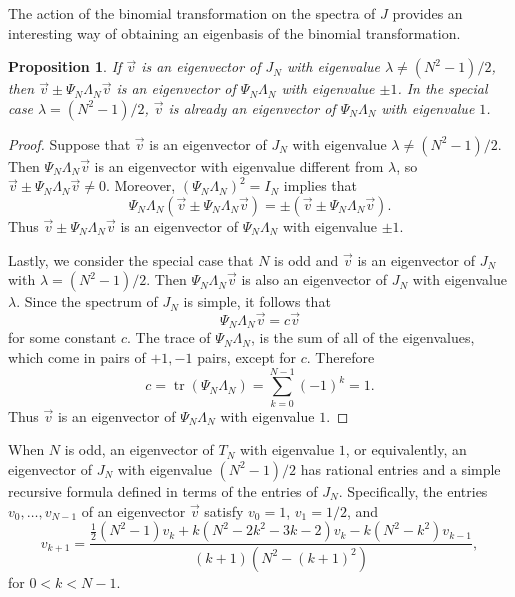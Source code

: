 \documentclass[11pt]{amsart}
\theoremstyle{plain}
\newtheorem{proposition}[theorem]{Proposition}
\theoremstyle{named}
\DeclareMathOperator \tr { {\mathrm{tr}} }
\begin{document}
The action of the binomial transformation on the spectra of $J$ provides an interesting way of obtaining an eigenbasis of the binomial transformation.
\begin{proposition}
If $\vec v$ is an eigenvector of $J_N$ with eigenvalue $\lambda\neq (N^2-1)/2$, then $\vec v \pm \Psi_N\Lambda_N\vec v$ is an eigenvector of $\Psi_N\Lambda_N$ with eigenvalue $\pm 1$.
In  the special case $\lambda=(N^2-1)/2$, $\vec v$ is already an eigenvector of $\Psi_N\Lambda_N$ with eigenvalue $1$.
\end{proposition}
\begin{proof}
Suppose that $\vec v$ is an eigenvector of $J_N$ with eigenvalue $\lambda\neq (N^2-1)/2$.
Then $\Psi_N\Lambda_N\vec v$ is an eigenvector with eigenvalue different from $\lambda$, so $\vec v\pm \Psi_N\Lambda_N\vec v\neq 0$.
Moreover, $(\Psi_N\Lambda_N)^2=I_N$ implies that
$$\Psi_N\Lambda_N(\vec v\pm \Psi_N\Lambda_N\vec v) = \pm (\vec v\pm \Psi_N\Lambda_N\vec v).$$
Thus $\vec v\pm \Psi_N\Lambda_N\vec v$ is an eigenvector of $\Psi_N\Lambda_N$ with eigenvalue $\pm 1$.

Lastly, we consider the special case that $N$ is odd and $\vec v$ is an eigenvector of $J_N$ with  $\lambda = (N^2-1)/2$.
Then $\Psi_N\Lambda_N \vec v$ is also an eigenvector of $J_N$ with eigenvalue $\lambda$.
Since the spectrum of $J_N$ is simple, it follows that
$$\Psi_N\Lambda_N\vec v = c\vec v$$
for some constant $c$.
The trace of $\Psi_N\Lambda_N$, is the sum of all of the eigenvalues, which come in pairs of $+1,-1$ pairs, except for $c$.
Therefore
$$c = \tr(\Psi_N\Lambda_N) = \sum_{k=0}^{N-1} (-1)^k = 1.$$
Thus $\vec v$ is an eigenvector of $\Psi_N\Lambda_N$ with eigenvalue $1$.
\end{proof}

When $N$ is odd, an eigenvector of $T_N$ with eigenvalue $1$, or equivalently, an eigenvector of $J_N$ with eigenvalue $(N^2-1)/2$ has rational entries and a simple recursive formula defined in terms of the entries of $J_N$.
Specifically, the entries $v_0,\dots,v_{N-1}$ of an eigenvector $\vec v$ satisfy $v_0=1$, $v_1=1/2$, and
\begin{equation}
v_{k+1} = \frac{\frac{1}{2}(N^2-1)v_k+k(N^2-2k^2-3k-2)v_k - k(N^2 - k^2)v_{k-1}}{(k+1)(N^2 - (k+1)^2)} ,
\end{equation}
for $0< k < N-1$.
\end{document}
